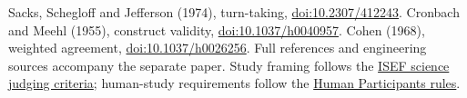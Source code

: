 \documentclass{article}
\begin{document}
\small
Sacks, Schegloff and Jefferson (1974), turn-taking, \href{https://doi.org/10.2307/412243}{doi:10.2307/412243}. Cronbach and Meehl (1955), construct validity, \href{https://doi.org/10.1037/h0040957}{doi:10.1037/h0040957}. Cohen (1968), weighted agreement, \href{https://doi.org/10.1037/h0026256}{doi:10.1037/h0026256}. Full references and engineering sources accompany the separate paper. Study framing follows the \href{https://www.societyforscience.org/isef/grand-award/criteria/}{ISEF science judging criteria}; human-study requirements follow the \href{https://www.societyforscience.org/isef/international-rules/human-participants/}{Human Participants rules}.
\end{document}
